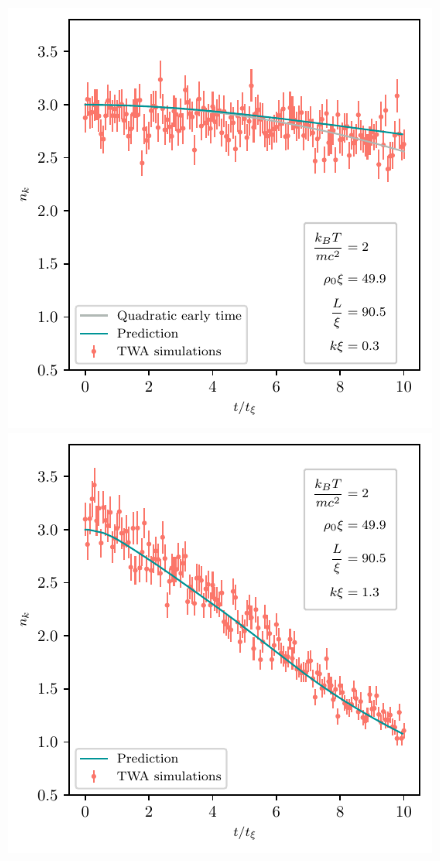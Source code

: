 \documentclass[aps,prd,notitlepage,amsfonts,amssymb,amsmath,nofootinbib,superscriptaddress,longbibliography]{revtex4-2}
\begin{document}
\begin{appendices}
\begin{figure}
     \centering
    
     \begin{minipage}{0.45\textwidth}
        \centering
        \includegraphics[width=\textwidth]{fig9a.pdf}
    \end{minipage} \hfill
          \begin{minipage}{0.45\textwidth}
        \centering
         \includegraphics[width=\textwidth]{fig9b.pdf}
  

\end{minipage}
\end{figure}
\end{appendices}
\end{document}
